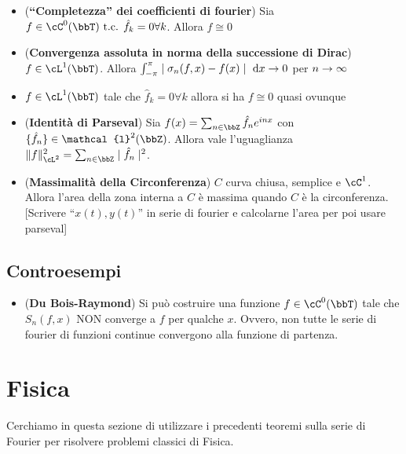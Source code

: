 \documentclass[a4paper,NoNotes,GeneralMath]{stdmdoc}
\newcommand{\intpie}{\int_{-\pi}^\pi }
\newcommand{\CT}[1]{\cC^{#1}(\bbT)}
\newcommand{\LT}[1]{\cL^{#1}(\bbT)}
\newcommand{\cl}{\mathcal{l}}
\begin{document}
\begin{itemize}
        \item ({\bf ``Completezza'' dei coefficienti di fourier}) Sia $f \in \CT{0} \tc \hat{f}_k = 0 \forall k$. Allora $f \cong 0$
        \item ({\bf Convergenza assoluta in norma della successione di Dirac}) $f \in \LT{1}$. Allora $\intpie \abs{\sigma_n(f, x) - f(x)} \de x \rar 0$ per $n \rightarrow \infty$
        \item $f \in \LT{1}$ tale che $\hat{f}_k = 0 \forall k$ allora si ha $f \cong 0$ quasi ovunque
        \item ({\bf Identità di Parseval}) Sia $f(x) = \sum_{n \in \bbZ} \hat{f}_n e^{inx}$ con $\{\hat{f}_n\} \in \cl^2(\bbZ)$. Allora vale l'uguaglianza $\norm{f}^2_{\cL^2} = \sum_{n \in \bbZ} \abs{\hat{f}_n}^2$.
          \item ({\bf Massimalità della Circonferenza}) $C$ curva chiusa, semplice e $\cC^1$. Allora l'area della zona interna a $C$ è massima quando $C$ è la circonferenza. [Scrivere ``$x(t), y(t)$'' in serie di fourier e calcolarne l'area per poi usare parseval]
        \end{itemize}

        \subsection*{Controesempi}
        \begin{itemize}
        \item ({\bf Du Bois-Raymond}) Si può costruire una funzione $f \in \CT{0}$ tale che $S_n(f, x)$ NON converge a $f$ per qualche $x$. Ovvero, non tutte le serie di fourier di funzioni continue convergono alla funzione di partenza.
        \end{itemize}


        \section*{Fisica}
        Cerchiamo in questa sezione di utilizzare i precedenti teoremi sulla serie di Fourier per risolvere problemi classici di Fisica.
\end{document}
